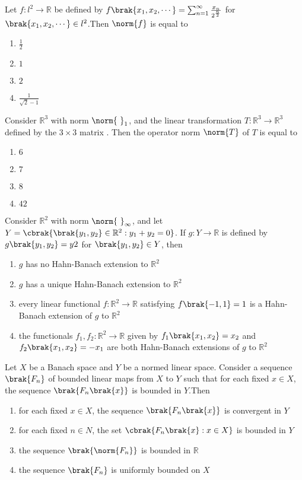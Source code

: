 \item{
Let $f:l^2\rightarrow\mathbb{R}$ be defined by $f\brak{x_1,x_2,\cdots}=\sum_{n=1}^\infty\frac{x_n}{2^{\frac{n}{2}}}$ for $\brak{x_1,x_2,\cdots}\in l^2$.Then $\norm{f}$ is equal to
\begin{multicols}{4}
\begin{enumerate}
\item $\frac{1}{2}$
\item $1$
\item $2$
\item $\frac{1}{\sqrt{2}-1}$
\end{enumerate}
\end{multicols}
}
\item{
Consider $\mathbb{R}^3$ with norm $\norm{\text{ }}_1$, and the linear transformation $T:\mathbb{R}^3\rightarrow\mathbb{R}^3$ defined by the $3\times3$ matrix . Then the operator norm $\norm{T}$ of $T$ is equal to
\begin{multicols}{4}
\begin{enumerate}
\item $6$
\item $7$
\item $8$
\item $42$
\end{enumerate}
\end{multicols}
}
\item{
Consider $\mathbb{R}^2$ with norm $\norm{\text{ }}_\infty$, and let $Y=\cbrak{\brak{y_1,y_2}\in \mathbb{R}^2:y_1+y_2=0}$. If $g:Y\rightarrow\mathbb{R}$ is defined by $g\brak{y_1,y_2}=y2$ for $\brak{y_1,y_2}\in Y$, then
\begin{enumerate}
\item $g$ has no Hahn-Banach extension to $\mathbb{R}^2$
\item $g$ has a unique Hahn-Banach extension to $\mathbb{R}^2$
\item every linear functional $f:\mathbb{R}^2\rightarrow\mathbb{R}$ satisfying $f\brak{-1,1}=1$ is a Hahn-Banach extension of $g$ to $\mathbb{R}^2$ 
\item the functionals $f_1,f_2:\mathbb{R}^2\rightarrow\mathbb{R}$ given by $f_1\brak{x_1,x_2}=x_2$ and $f_2\brak{x_1,x_2}=-x_1$ are both Hahn-Banach extensions of $g$ to $\mathbb{R}^2$ 
\end{enumerate}
}
\item{
Let $X$ be a Banach space and $Y$ be a normed linear space. Consider a sequence $\brak{F_n}$ of bounded linear maps from $X$ to $Y$ such that for each fixed $x\in X$, the sequence $\brak{F_n\brak{x}}$ is bounded in $Y$.Then
\begin{enumerate}
\item for each fixed $x\in X$, the sequence $\brak{F_n\brak{x}}$ is convergent in $Y$
\item for each fixed $n\in N$, the set $\cbrak{F_n\brak{x}:x\in X}$ is bounded in $Y$
\item the sequence $\brak{\norm{F_n}}$ is bounded in $\mathbb{R}$
\item the sequence $\brak{F_n}$ is uniformly bounded on $X$
\end{enumerate}
}
